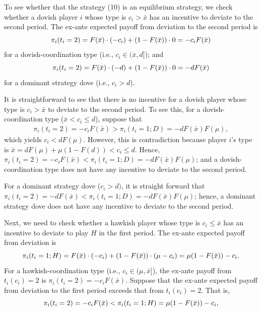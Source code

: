 \documentclass[12pt,english]{article}
\begin{document}
To see whether that the strategy (10) is an equilibrium strategy, we check whether a dovish player $i$ whose type is $c_i > \bar{x}$ has an incentive to deviate to the second period. The ex-ante expected payoff from deviation to the second period is
\begin{equation}
\pi_i(t_i=2)=F(\bar{x}) \cdot (-c_i) +(1-F(\bar{x})) \cdot 0=-c_iF(\bar{x}) \notag
\end{equation}
for a dovish-coordination type (i.e., $c_i \in (\bar{x},d]$); and
\begin{equation}
\pi_i(t_i=2)=F(\bar{x}) \cdot (-d) +(1-F(\bar{x})) \cdot 0=-dF(\bar{x}) \notag
\end{equation}
for a dominant strategy dove (i.e., $c_i > d$). \par
It is straightforward to see that there is no incentive for a dovish player whose type is $c_i > \bar{x}$ to deviate to the second period.  To see this, for a dovish-coordination type ($\bar{x}<c_i \leq d$), suppose that 
\begin{align*}
\pi_i(t_i=2)=-c_iF(\bar{x})> \pi_i(t_i=1; D)=-dF(\bar{x})F(\mu),
\end{align*}
which yields $c_i < dF(\mu)$. However, this is contradiction because player $i$'s type is $\bar{x}=dF(\mu)+\mu(1-F(d)) < c_i \leq d$. Hence, $\pi_i(t_i=2)=-c_iF(\bar{x})< \pi_i(t_i=1; D)=-dF(\bar{x})F(\mu)$; and a dovish-coordination type does not have any incentive to deviate to the second period.\par 
For a dominant strategy dove ($c_i>d)$, it is straight forward that $\pi_i(t_i=2)=-dF(\bar{x})< \pi_i(t_i=1; D)=-dF(\bar{x})F(\mu)$; hence, a dominant strategy dove does not have any incentive to deviate to the second period. \par 
Next, we need to check whether a hawkish player whose type is $c_i \leq \bar{x}$ has an incentive to deviate to play $H$ in the first period. The ex-ante expected payoff from deviation is
\begin{equation}
\pi_i(t_i=1;H)=F(\bar{x})\cdot(-c_i)+(1-F(\bar{x}))\cdot (\mu-c_i) = \mu(1-F(\bar{x})) -c_i. \notag
\end{equation}
For a hawkish-coordination type (i.e., $c_i \in (\mu, \bar{x}]$), the ex-ante payoff from $t_i(c_i)=2$ is $\pi_i(t_i=2)=-c_iF(\bar{x})$. Suppose that the ex-ante expected payoff from deviation to the first period exceeds that from $t_i(c_i)=2$. That is,
\begin{equation}
\pi_i(t_i=2)=-c_iF(\bar{x})< \pi_i(t_i=1;H)= \mu(1-F(\bar{x})) -c_i,\notag
\end{equation}
\end{document}

